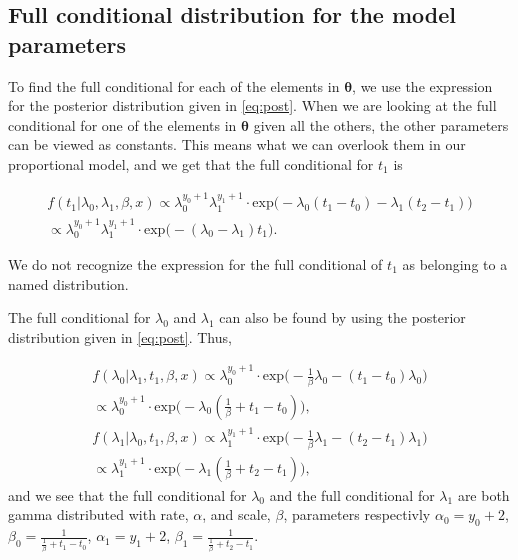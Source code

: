 \subsection{Full conditional distribution for the model parameters} \label{full_cond}

To find the full conditional for each of the elements in $\boldsymbol{\theta}$, we use the expression for the posterior distribution given in \eqref{eq:post}. When we are looking at the full conditional for one of the elements in $\boldsymbol{\theta}$ given all the others, the other parameters can be viewed as constants. This means what we can overlook them in our proportional model, and we get that the full conditional for $t_1$ is

\begin{align}
    f(t_1 | \lambda_0, \lambda_1, \beta, x) \propto 
    \lambda_0^{y_0 + 1} \lambda_1^{y_1 + 1} \cdot \text{exp} \Big( -\lambda_0(t_1 - t_0) - \lambda_1 (t_2 - t_1) \Big) \nonumber \\
    \propto  \lambda_0^{y_0 + 1} \lambda_1^{y_1 + 1} \cdot \text{exp} \Big( -(\lambda_0 - \lambda_1)t_1 \Big).
\end{align}

We do not recognize the expression for the full conditional of $t_1$ as belonging to a named distribution. 

The full conditional for $\lambda_0$ and $\lambda_1$ can also be found by using the posterior distribution given in \eqref{eq:post}. Thus, 

\begin{align}
    f(\lambda_0 | \lambda_1, t_1, \beta, x) \propto
    \lambda_0^{y_0 + 1}\cdot \text{exp} \Big( -\frac{1}{\beta} \lambda_0 - (t_1 - t_0)\lambda_0 \Big) 
    \nonumber \\
    \propto  \lambda_0^{y_0 + 1} \cdot \text{exp} \Big( - \lambda_0 (\frac{1}{\beta} + t_1 - t_0) \Big),
     \\
    f(\lambda_1 | \lambda_0, t_1, \beta, x) \propto
    \lambda_1^{y_1 + 1}\cdot \text{exp} \Big( -\frac{1}{\beta} \lambda_1 - (t_2 - t_1)\lambda_1 \Big) \nonumber \\
    \propto  \lambda_1^{y_1 + 1} \cdot \text{exp} \Big( - \lambda_1 (\frac{1}{\beta} + t_2 - t_1) \Big),
\end{align}
and we see that the full conditional for $\lambda_0$ and the full conditional for $\lambda_1$ are both gamma distributed with rate, $\alpha$, and scale, $\beta$, parameters respectivly $\alpha_0 = y_0 + 2$, $\beta_0 = \frac{1}{\frac{1}{\beta} + t_1 - t_0}$, $\alpha_1 = y_1 + 2$, $\beta_1 = \frac{1}{\frac{1}{\beta} + t_2 - t_1}$. 



